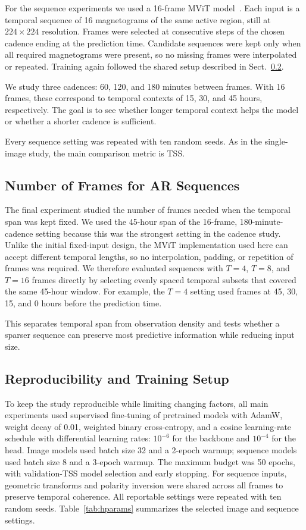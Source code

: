 \documentclass[runningheads]{llncs}
\begin{document}
For the sequence experiments we used a 16-frame MViT model~\cite{ref_mvit}. Each input is a temporal sequence of 16 magnetograms of the same active region, still at $224 \times 224$ resolution. Frames were selected at consecutive steps of the chosen cadence ending at the prediction time. Candidate sequences were kept only when all required magnetograms were present, so no missing frames were interpolated or repeated. Training again followed the shared setup described in Sect.~\ref{sec:repro}.

We study three cadences: 60, 120, and 180 minutes between frames. With 16 frames, these correspond to temporal contexts of 15, 30, and 45 hours, respectively. The goal is to see whether longer temporal context helps the model or whether a shorter cadence is sufficient.

Every sequence setting was repeated with ten random seeds. As in the single-image study, the main comparison metric is TSS.

\subsection{Number of Frames for AR Sequences}

The final experiment studied the number of frames needed when the temporal span was kept fixed. We used the 45-hour span of the 16-frame, 180-minute-cadence setting because this was the strongest setting in the cadence study. Unlike the initial fixed-input design, the MViT implementation used here can accept different temporal lengths, so no interpolation, padding, or repetition of frames was required. We therefore evaluated sequences with $T=4$, $T=8$, and $T=16$ frames directly by selecting evenly spaced temporal subsets that covered the same 45-hour window. For example, the $T=4$ setting used frames at 45, 30, 15, and 0 hours before the prediction time.

This separates temporal span from observation density and tests whether a sparser sequence can preserve most predictive information while reducing input size.






\subsection{Reproducibility and Training Setup}
\label{sec:repro}

To keep the study reproducible while limiting changing factors, all main experiments used supervised fine-tuning of pretrained models with AdamW, weight decay of 0.01, weighted binary cross-entropy, and a cosine learning-rate schedule with differential learning rates: $10^{-6}$ for the backbone and $10^{-4}$ for the head. Image models used batch size 32 and a 2-epoch warmup; sequence models used batch size 8 and a 3-epoch warmup. The maximum budget was 50 epochs, with validation-TSS model selection and early stopping. For sequence inputs, geometric transforms and polarity inversion were shared across all frames to preserve temporal coherence. All reportable settings were repeated with ten random seeds. Table~\ref{tab:hparams} summarizes the selected image and sequence settings.
\end{document}
